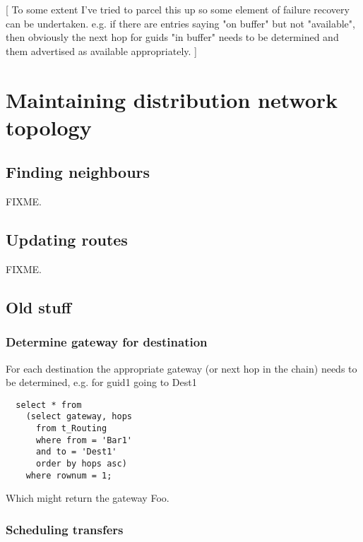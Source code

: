 \documentclass{cmspaper}
\begin{document}
[ To some extent I've tried to parcel this up so some element of failure recovery can be undertaken. e.g. if there are entries saying "on buffer" but not "available", then obviously the next hop for guids "in buffer" needs to be determined and them advertised as available appropriately. ]


\section{Maintaining distribution network topology}

\subsection{Finding neighbours}

FIXME.

\subsection{Updating routes}

FIXME.


\subsection{Old stuff}
\subsubsection{Determine gateway for destination}
For each destination the appropriate gateway (or next hop in the chain) needs to be determined, e.g. for guid1 going to Dest1

{\small\begin{verbatim}
  select * from
    (select gateway, hops
      from t_Routing
      where from = 'Bar1'
      and to = 'Dest1'
      order by hops asc)
    where rownum = 1;
\end{verbatim}}

Which might return the gateway Foo. 

\subsubsection{Scheduling transfers}
\end{document}
